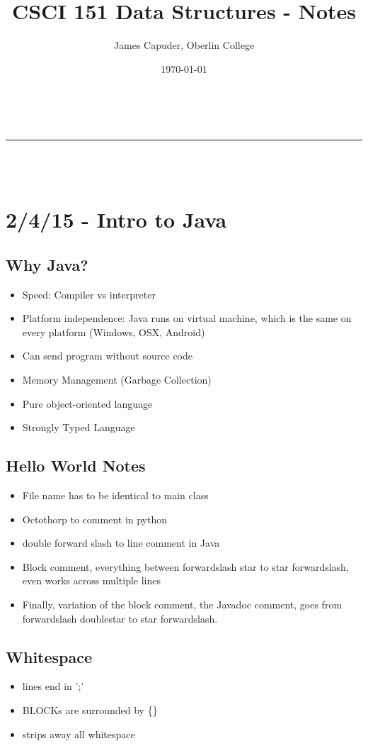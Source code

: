 \documentclass[a4paper,11pt]{article}
\makeatletter
\newcommand{\linia}{\rule{\linewidth}{0.5pt}}
\theoremstyle{mytheor}
\renewcommand{\maketitle}{
\begin{center}
\vspace{2ex}
{\huge \textsc{\@title}}
\vspace{1ex}
\\
\linia\\
\@author \hfill \@date\
\vspace{4ex}
\end{center}
}
\makeatother
\begin{document}
\title{CSCI 151 Data Structures - Notes}

\author{James Capuder, Oberlin College}

\date{\today}

\maketitle

\section*{2/4/15 - Intro to Java}
\subsection*{Why Java?}
\begin{itemize}
\item Speed: Compiler vs interpreter 
\item Platform independence: Java runs on virtual machine, which is the same on every platform (Windows, OSX, Android)
\item Can send program without source code
\item Memory Management (Garbage Collection)
\item Pure object-oriented language
\item Strongly Typed Language
\end{itemize}
\subsection*{Hello World Notes}
\begin{itemize}
\item File name has to be identical to main class
\item Octothorp to comment in python
\item double forward slash to line comment in Java
\item Block comment, everything between forwardslash star to star forwardslash, even works across multiple lines
\item Finally, variation of the block comment, the Javadoc comment, goes from forwardslash doublestar to star forwardslash.
\end{itemize}
\subsection*{Whitespace}
\begin{itemize}
\item lines end in ';'
\item BLOCKs are surrounded by \{\}
\item strips away all whitespace
\end{itemize}
\end{document}
